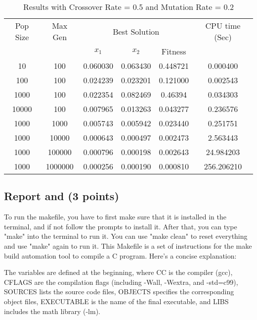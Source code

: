 \documentclass[12pt]{article}
\begin{document}
	\begin{table}[h!]
        \caption{Results with Crossover Rate = 0.5 and Mutation Rate = 0.2}
        \label{table:1}
        \centering
        \begin{tabular}{c c c c c c}
            \hline
            Pop Size & Max Gen & \multicolumn{3}{c}{Best Solution} & CPU time (Sec) \\
            & & $x_1$ & $x_2$ & Fitness & \\
            \hline
            10  & 100    & 0.060030 & 0.063430  & 0.448721 &0.000400 \\
            100 & 100    & 0.024239 & 0.023201 & 0.121000 &0.002543\\
            1000& 100    &0.022354  &0.082469  &0.46394 &0.034303\\
            10000& 100    &0.007965  &0.013263 &0.043277 &0.236576\\
            \hline
            1000  & 1000   &0.005743 &0.005942 &0.023440 &0.251751\\
            1000 & 10000  &0.000643  &0.000497  &0.002473 &2.563443\\
            1000& 100000 &0.000796  &0.000198   &0.002643 &24.984203\\
            1000& 1000000 &0.000256  &0.000190  &0.000810 &256.206210\\
            \hline
        \end{tabular}
    \end{table}

\subsection{Report and  (3 points)}
To run the makefile, you have to first make sure that it is installed in the terminal, and if not follow the prompts to install it. After that, you can type "make" into the terminal to run it. You can use "make clean" to reset everything and use "make" again to run it. This Makefile is a set of instructions for the make build automation tool to compile a C program. Here's a concise explanation:

The variables are defined at the beginning, where CC is the compiler (gcc), CFLAGS are the compilation flags (including -Wall, -Wextra, and -std=c99), SOURCES lists the source code files, OBJECTS specifies the corresponding object files, EXECUTABLE is the name of the final executable, and LIBS includes the math library (-lm).
\end{document}
